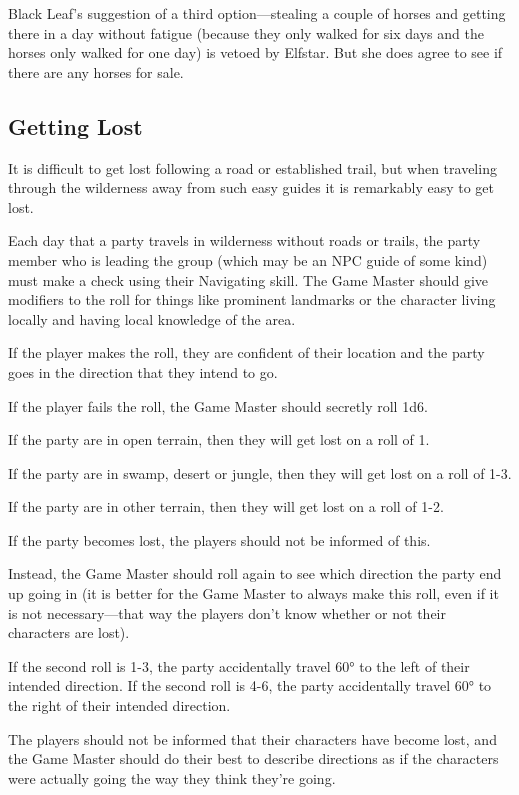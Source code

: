 \begin{multicols*}{2}
{Black Leaf’s suggestion of a third option—stealing a couple of horses and getting there in a day without fatigue (because they only walked for six days and the horses only walked for one day) is vetoed by Elfstar. But she does agree to see if there are any horses for sale.}

\subsection{Getting Lost}
It is difficult to get lost following a road or established trail, but when traveling through the wilderness away from such easy guides it is remarkably easy to get lost.

Each day that a party travels in wilderness without roads or trails, the party member who is leading the group (which may be an NPC guide of some kind) must make a  check using their Navigating skill. The Game Master should give modifiers to the roll for things like prominent landmarks or the character living locally and having local knowledge of the area.

If the player makes the roll, they are confident of their location and the party goes in the direction that they intend to go.

If the player fails the roll, the Game Master should secretly roll 1d6.

If the party are in open terrain, then they will get lost on a roll of 1.

If the party are in swamp, desert or jungle, then they will get lost on a roll of 1-3.

If the party are in other terrain, then they will get lost on a roll of 1-2.

If the party becomes lost, the players should not be informed of this.

Instead, the Game Master should roll again to see which direction the party end up going in (it is better for the Game Master to always make this roll, even if it is not necessary—that way the players don’t know whether or not their characters are lost).

If the second roll is 1-3, the party accidentally travel 60° to the left of their intended direction. If the second roll is 4-6, the party accidentally travel 60° to the right of their intended direction.

The players should not be informed that their characters have become lost, and the Game Master should do their best to describe directions as if the characters were actually going the way they think they’re going.


\end{multicols*}
